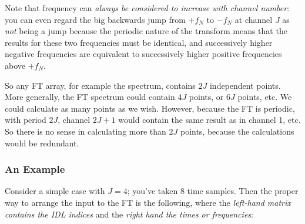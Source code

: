 \documentclass[psfig,preprint]{aastex}
\begin{document}
          Note that frequency can {\it always be considered to increase
with channel number}: you can even regard the big backwards jump from
$+f_N$ to $-f_N$ at channel $J$ as {\it not} being a jump because the
periodic nature of the transform means that the results for these two
frequencies must be identical, and successively higher negative
frequencies are equivalent to successively higher positive frequencies
above $+f_N$. 

          So any FT array, for example the spectrum, contains $2J$
independent points.  More generally, the FT spectrum could contain $4J$
points, or $6J$ points, etc.  We could calculate as many points as we
wish.  However, because the FT is periodic, with period $2J$, channel
$2J+1$ would contain the same result as in channel 1, etc.  So there is
no sense in calculating more than $2J$ points, because the calculations
would be redundant. 

\subsubsection{An Example}

          Consider a simple case with $J=4$; you've taken 8 time
samples.  Then the proper way to arrange the input to the FT is the
following, where the {\it left-hand matrix contains the IDL indices} and
the {\it right hand the times or frequencies}:
\end{document}
